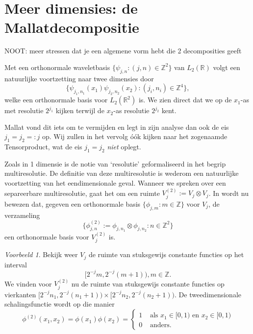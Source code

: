 \documentclass[11pt]{uvamath}
\newcommand{\R}{\mathbb{R}}
\newcommand{\Z}{\mathbb{Z}}
\theoremstyle{plain}
\theoremstyle{definition}
\theoremstyle{remark}
\newtheorem*{voorbeeld}{Voorbeeld}
\begin{document}
\section{Meer dimensies: de Mallatdecompositie}
NOOT: meer stressen dat je een algemene vorm hebt die 2 decomposities geeft

Met een orthonormale waveletbasis $\{ \psi_{j,n}: (j,n) \in \Z^2\}$ van $L_2(\R)$ volgt een natuurlijke voortzetting naar twee dimensies door
\[
\{ \psi_{j_1,n_1}(x_1) \psi_{j_2,n_2}(x_2): (j_i,n_i) \in \Z^4 \},
\]
welke een orthonormale basis voor $L_2(\R^2)$ is. We zien direct dat we op de $x_1$-as met resolutie $2^{j_1}$ kijken terwijl de $x_2$-as resolutie $2^{j_2}$ kent.

Mallat vond dit iets om te vermijden \cite[\S 7.7]{mallat} en legt in zijn analyse dan ook de eis $j_1 = j_2 =: j$ op. Wij zullen in het vervolg \'o\'ok kijken naar het zogenaamde Tensorproduct, wat de eis $j_1 = j_2$ \emph{niet} oplegt.

Zoals in 1 dimensie is de notie van `resolutie' geformaliseerd in het begrip multiresolutie. De definitie van deze multiresolutie is wederom een natuurlijke voortzetting van het eendimensionale geval. Wanneer we spreken over een separeerbare multiresolutie, gaat het om een ruimte $V_j^{(2)} := V_j \otimes V_j$. In \cite[A.5]{mallat} wordt nu bewezen dat, gegeven een orthonormale basis $\{ \phi_{j,m}: m \in \Z \}$ voor $V_j$, de verzameling
\begin{equation}
  \label{phi_phi_basis}
  \{ \phi^{(2)}_{j,n} := \phi_{j,n_1} \otimes \phi_{j,n_2}: n \in \Z^2 \}
\end{equation}
een orthonormale basis voor $V_j^{(2)}$ is.

\begin{voorbeeld}
Bekijk weer $V_j$ de ruimte van stuksgewijs constante functies op het interval 
\[
 [2^{-j} m, 2^{-j}(m+1) ), m \in \Z.
\] 
We vinden voor $V_j^{(2)}$ nu de ruimte van stuksgewijs constante functies op vierkanten $[2^{-j}n_1, 2^{-j}(n_1+1)) \times [2^{-j}n_2, 2^{-j}(n_2+1))$. De tweedimensionale schalingsfunctie wordt op die manier
\[
	\phi^{(2)}(x_1,x_2) = \phi(x_1)\phi(x_2) = \begin{cases} 1 & \text{ als } x_1 \in [0,1)\text{ en }x_2 \in [0,1) \\ 0 & \text{ anders.} \end{cases}
\]
\end{voorbeeld}
\end{document}
